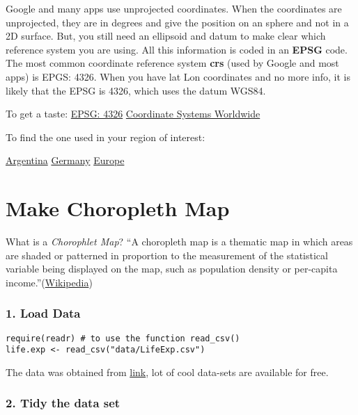 \documentclass[
]{book}
\theoremstyle{definition}
\theoremstyle{definition}
\theoremstyle{definition}
\theoremstyle{definition}
\theoremstyle{remark}
\begin{document}
Google and many apps use unprojected coordinates. When the coordinates are unprojected, they are in degrees and give the position on an sphere and not in a 2D surface. But, you still need an ellipsoid and datum to make clear which reference system you are using. All this information is coded in an \textbf{EPSG} code.
The most common coordinate reference system \textbf{crs} (used by Google and most apps) is EPGS: 4326. When you have lat Lon coordinates and no more info, it is likely that the EPSG is 4326, which uses the datum WGS84.

To get a taste:
\href{https://epsg.io/map\#srs=4326\&x=0.000000\&y=0.000000\&z=1\&layer=streets}{EPSG: 4326}
\href{https://epsg.io}{Coordinate Systems Worldwide}

To find the one used in your region of interest:

\href{https://spatialreference.org/ref/?search=argentina}{Argentina}
\href{https://spatialreference.org/ref/?search=germany}{Germany}
\href{https://spatialreference.org/ref/?search=europe}{Europe}

\hypertarget{make-choropleth-map}{%
\section{Make Choropleth Map}\label{make-choropleth-map}}

What is a \emph{Chorophlet Map}? ``A choropleth map is a thematic map in which areas are shaded or patterned in proportion to the measurement of the statistical variable being displayed on the map, such as population density or per-capita income.''(\href{https://en.Wikipedia.org/wiki/Choropleth_map}{Wikipedia})

\hypertarget{load-data}{%
\subsubsection{1. Load Data}\label{load-data}}

\begin{verbatim}
require(readr) # to use the function read_csv()
life.exp <- read_csv("data/LifeExp.csv")
\end{verbatim}

The data was obtained from \href{https://www.kaggle.com/kumarajarshi/life-expectancy-who}{link}, lot of cool data-sets are available for free.

\hypertarget{tidy-the-data-set}{%
\subsubsection{2. Tidy the data set}\label{tidy-the-data-set}}
\end{document}
